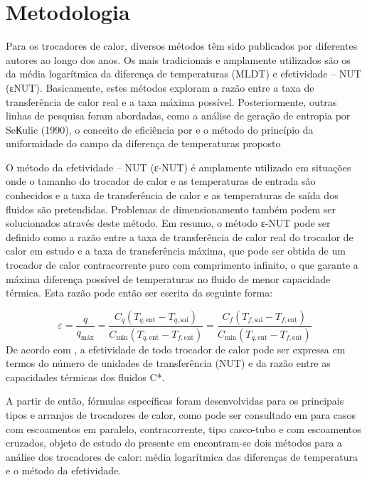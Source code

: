 \section{Metodologia}
Para os trocadores de calor, diversos métodos têm sido publicados por diferentes autores ao longo dos anos. Os mais tradicionais e amplamente utilizados são os da média logarítmica da diferença de temperaturas (MLDT) e efetividade – NUT (εNUT). Basicamente, estes métodos exploram a razão entre a taxa de transferência de calor real e a taxa máxima possível. Posteriormente, outras linhas de pesquisa foram abordadas, como a análise de geração de entropia por SeКulic (1990), o conceito de eficiência por \cite{orgeda_2020_trocadores} e o método do princípio da uniformidade do campo da diferença de temperaturas proposto \cite{cengel_2012_transferencia}

O método da efetividade – NUT (ε-NUT) é amplamente utilizado em situações onde o tamanho do trocador de calor e as temperaturas de entrada são conhecidos e a taxa de transferência de calor e as temperaturas de saída dos fluidos são pretendidas. Problemas de dimensionamento também podem ser solucionados através deste método. Em resumo, o método ε-NUT pode ser definido como a razão entre a taxa de transferência de calor real do trocador de calor em estudo e a taxa de transferência máxima, que pode ser obtida de um trocador de calor contracorrente puro com comprimento infinito, o que garante a máxima diferença possível de temperaturas no fluido de menor capacidade térmica. Esta razão pode então ser escrita da seguinte forma: \cite{stenstrasser_2017_projeto, abdallah_2018_multi}

\begin{equation}
	\varepsilon = \frac{q}{q_{\text{máx}}} = \frac{C_q (T_{q,\text{ent}} - T_{q,\text{sai}})}{C_{\text{min}}(T_{q,\text{ent}} - T_{f,\text{ent}})} = \frac{C_f (T_{f,\text{sai}} - T_{f,\text{ent}})}{C_{\text{min}}(T_{q,\text{ent}} - T_{f,\text{ent}})}
\end{equation}
De acordo com , a efetividade de todo trocador de calor pode ser expressa em termos do número de unidades de transferência (NUT) e da razão entre as capacidades térmicas dos fluidos C*. 

A partir de então, fórmulas específicas foram desenvolvidas para os principais tipos e arranjos de trocadores de calor, como pode ser consultado em  para casos com escoamentos em paralelo, contracorrente, tipo casco-tubo e com escoamentos cruzados, objeto de estudo do presente em  encontram-se dois métodos para a análise dos trocadores de calor: média logarítmica das diferenças de temperatura e o método da efetividade. 

